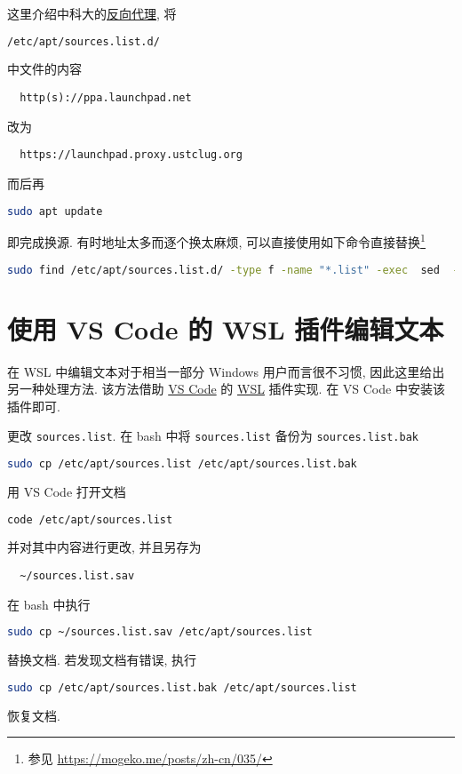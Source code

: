 这里介绍中科大的\href{https://mirrors.ustc.edu.cn/}{反向代理},
将
\begin{lstlisting}[language = bash]
  /etc/apt/sources.list.d/
\end{lstlisting}
中文件的内容
\begin{lstlisting}
  http(s)://ppa.launchpad.net
\end{lstlisting}
改为
\begin{lstlisting}
  https://launchpad.proxy.ustclug.org
\end{lstlisting}
而后再
\begin{lstlisting}[language = bash]
  sudo apt update
\end{lstlisting}
即完成换源.
有时地址太多而逐个换太麻烦,
可以直接使用如下命令直接替换\footnote{参见 \url{https://mogeko.me/posts/zh-cn/035/}}
\begin{lstlisting}[language = bash]
  sudo find /etc/apt/sources.list.d/ -type f -name "*.list" -exec  sed  -i.bak -r  's#deb(-src)?\s*http(s)?://ppa.launchpad.net#deb\1 https\2://launchpad.proxy.ustclug.org#ig' {} \;
\end{lstlisting}

\section{使用 VS Code 的 WSL 插件编辑文本}\label{sec:vscode-wsl}

在 WSL 中编辑文本对于相当一部分 Windows 用户而言很不习惯,
因此这里给出另一种处理方法.
该方法借助 \href{https://code.visualstudio.com/}{VS Code} 的 \href{https://marketplace.visualstudio.com/items?itemName=ms-vscode-remote.remote-wsl}{WSL} 插件实现.
在 VS Code 中安装该插件即可.

更改 \texttt{sources.list}.
在 \textsf{bash} 中将 \texttt{sources.list} 备份为 \texttt{sources.list.bak}
\begin{lstlisting}[language=bash]
  sudo cp /etc/apt/sources.list /etc/apt/sources.list.bak
\end{lstlisting}
用 VS Code 打开文档
\begin{lstlisting}[language=bash]
  code /etc/apt/sources.list
\end{lstlisting}
并对其中内容进行更改,
并且另存为
\begin{lstlisting}
  ~/sources.list.sav
\end{lstlisting}
在 \textsf{bash} 中执行
\begin{lstlisting}[language=bash]
  sudo cp ~/sources.list.sav /etc/apt/sources.list
\end{lstlisting}
替换文档.
若发现文档有错误,
执行
\begin{lstlisting}[language=bash]
  sudo cp /etc/apt/sources.list.bak /etc/apt/sources.list
\end{lstlisting}
恢复文档.

